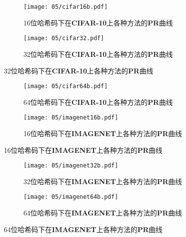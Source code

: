 \begin{figure}[!htp]
    \centering
    \begin{subfigure}{\textwidth}
      \centering
      \texttt{[image: 05/cifar16b.pdf]}
      \caption{16位哈希码下在\textbf{CIFAR-10}上各种方法的\textbf{PR}曲线}
    \end{subfigure}
    \hspace{1cm}
    \begin{subfigure}{\textwidth}
      \centering
      \texttt{[image: 05/cifar32.pdf]}
      \caption{32位哈希码下在\textbf{CIFAR-10}上各种方法的\textbf{PR}曲线}
    \end{subfigure}
    \label{fig:abloss1}
  \end{figure}
  \begin{figure}[!htp]
    \centering
    \begin{subfigure}{\textwidth}
      \centering
      \texttt{[image: 05/cifar64b.pdf]}
      \caption{64位哈希码下在\textbf{CIFAR-10}上各种方法的\textbf{PR}曲线}
    \end{subfigure}
    \hspace{1cm}
    \begin{subfigure}{\textwidth}
      \centering
      \texttt{[image: 05/imagenet16b.pdf]}
      \caption{16位哈希码下在\textbf{IMAGENET}上各种方法的\textbf{PR}曲线}
    \end{subfigure}
    \label{fig:abloss2}
  \end{figure}
  \begin{figure}[!htp]
    \centering
    \begin{subfigure}{\textwidth}
      \centering
      \texttt{[image: 05/imagenet32b.pdf]}
      \caption{32位哈希码下在\textbf{IMAGENET}上各种方法的\textbf{PR}曲线}
    \end{subfigure}
    \hspace{1cm}
    \begin{subfigure}{\textwidth}
      \centering
      \texttt{[image: 05/imagenet64b.pdf]}
      \caption{64位哈希码下在\textbf{IMAGENET}上各种方法的\textbf{PR}曲线}
    \end{subfigure}
    \label{fig:abloss3}
  \end{figure}


